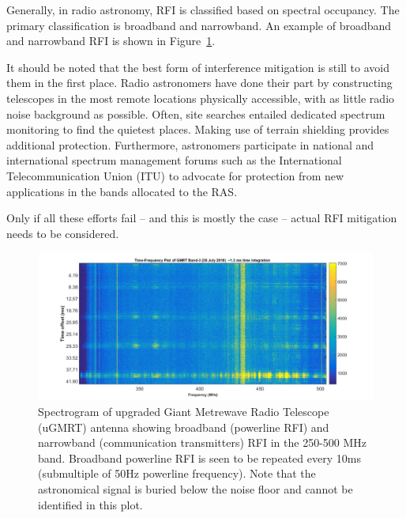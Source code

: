 Generally, in radio astronomy, RFI is classified based on spectral occupancy. The primary classification is broadband and narrowband. An example of broadband and narrowband RFI is shown in Figure~\ref{fig:ugmrt-rfi}.

It should be noted that the best form of interference mitigation is still to avoid them in the first place. Radio astronomers have done their part by constructing telescopes in the most remote locations physically accessible, with as little radio noise background as possible. Often, site searches entailed dedicated spectrum monitoring to find the quietest places. Making use of terrain shielding provides additional protection. Furthermore, astronomers participate in national and international spectrum management forums such as the International Telecommunication Union (ITU) to advocate for protection from new applications in the bands allocated to the RAS.

Only if all these efforts fail -- and this is mostly the case -- actual RFI mitigation needs to be considered.


\begin{figure}
    \centering
    \includegraphics[scale=0.25]{Hardware Excision Techniques/figures/time_freq(1).jpg}
    \caption{Spectrogram of upgraded Giant Metrewave Radio Telescope (uGMRT) \citep{gupta2017upgraded} antenna showing broadband (powerline RFI) and narrowband (communication transmitters) RFI in the 250-500 MHz band. Broadband powerline RFI is seen to be repeated every 10ms (submultiple of 50Hz powerline frequency). Note that the astronomical signal is buried below the noise floor and cannot be identified in this plot.}
    \label{fig:ugmrt-rfi}
\end{figure}




